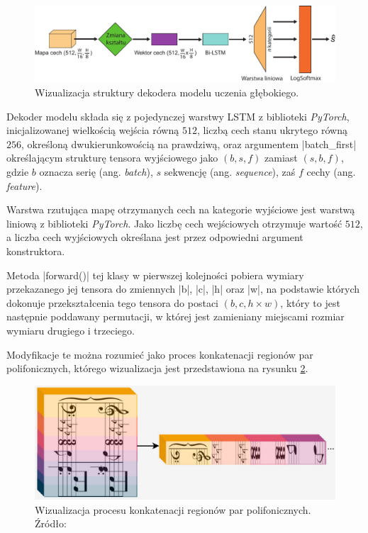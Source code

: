 \begin{figure}[h]
	\centering
	\includegraphics[width=15cm]{images/Decoder_illst}
	\caption{Wizualizacja struktury dekodera modelu uczenia głębokiego.}
	\label{fig:decoder-model-vis}
\end{figure}

Dekoder modelu składa się z pojedynczej warstwy LSTM z biblioteki \textit{PyTorch}, inicjalizowanej wielkością wejścia równą $512$, liczbą cech stanu ukrytego równą $256$, określoną dwukierunkowością na prawdziwą, oraz argumentem \pyth|batch_first| określającym strukturę tensora wyjściowego jako $(b, s, f)$ zamiast $(s, b, f)$, gdzie $b$ oznacza serię (ang. \textit{batch}), $s$ sekwencję (ang. \textit{sequence}), zaś $f$ cechy (ang. \textit{feature}).

Warstwa rzutująca mapę otrzymanych cech na kategorie wyjściowe jest warstwą liniową z biblioteki \textit{PyTorch}. Jako liczbę cech wejściowych otrzymuje wartość $512$, a liczba cech wyjściowych określana jest przez odpowiedni argument konstruktora.

Metoda \pyth|forward()| tej klasy w pierwszej kolejności pobiera wymiary przekazanego jej tensora do zmiennych \pyth|b|, \pyth|c|, \pyth|h| oraz \pyth|w|, na podstawie których dokonuje przekształcenia tego tensora do postaci $(b, c, h \times w)$, który to jest następnie poddawany permutacji, w której jest zamieniany miejscami rozmiar wymiaru drugiego i trzeciego.

Modyfikacje te można rozumieć jako proces konkatenacji regionów par polifonicznych, którego wizualizacja jest przedstawiona na rysunku \ref{fig:rowijanie-nut}.


\begin{figure}[h]
	\centering
	\includegraphics[width=15cm]{images/rozwijanie-nut.png}
	\caption{Wizualizacja procesu konkatenacji regionów par polifonicznych. Źródło: \cite{Rios-Vila2023}}
	\label{fig:rowijanie-nut}
\end{figure}


